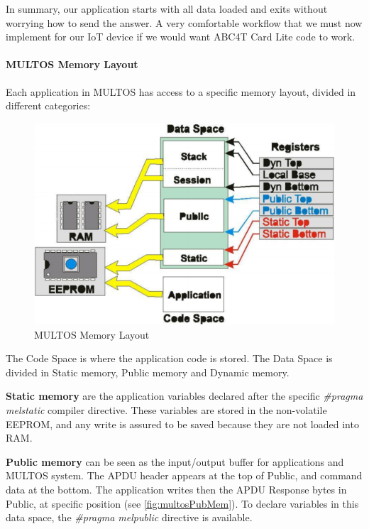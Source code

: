 In summary, our application starts with all data loaded and exits without worrying how to send the answer. A very comfortable workflow that we must now implement for our IoT device if we would want ABC4T Card Lite code to work.

\paragraph{MULTOS Memory Layout}

Each application in MULTOS has access to a specific memory layout, divided in different categories:

\begin{figure}[bth]
	\begin{center}
		\includegraphics[width=\linewidth]{gfx/multosMemLay}
	\end{center}
	\caption{MULTOS Memory Layout}
	\label{fig:multosMemLay}
\end{figure}


The Code Space is where the application code is stored.
The Data Space is divided in Static memory, Public memory and Dynamic memory.

\textbf{Static memory} are the application variables declared after the specific \textit{\#pragma melstatic} compiler directive. These variables are stored in the non-volatile EEPROM, and any write is assured to be saved because they are not loaded into RAM.

\textbf{Public memory} can be seen as the input/output buffer for applications and MULTOS system. The APDU header appears at the top of Public, and command data at the bottom. The application writes then the APDU Response bytes in Public, at specific position (see \autoref{fig:multosPubMem}). To declare variables in this data space, the \textit{\#pragma melpublic} directive is available.


